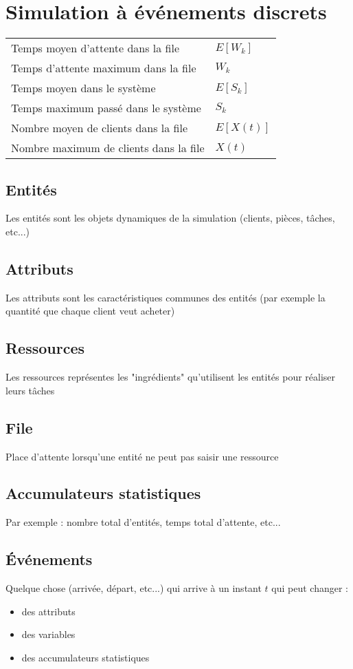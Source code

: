 \documentclass[resume]{subfiles}
\begin{document}
\section{Simulation à événements discrets}
\begin{center}
\small
\begin{tabular}{ll}
Temps moyen d'attente dans la file & $E[W_k]$\\
Temps d'attente maximum dans la file & $W_k$\\
Temps moyen dans le système & $E[S_k]$\\
Temps maximum passé dans le système & $S_k$\\
Nombre moyen de clients dans la file & $E[X(t)]$\\
Nombre maximum de clients dans la file & $X(t)$\\
\end{tabular}
\end{center}
\subsection{Entités}
Les entités sont les objets dynamiques de la simulation (clients, pièces, tâches, etc...)
\subsection{Attributs}
Les attributs sont les caractéristiques communes des entités (par exemple la quantité que chaque client veut acheter)
\subsection{Ressources}
Les ressources représentes les "ingrédients" qu'utilisent les entités pour réaliser leurs tâches
\subsection{File}
Place d'attente lorsqu'une entité ne peut pas saisir une ressource
\subsection{Accumulateurs statistiques}
Par exemple : nombre total d'entités, temps total d'attente, etc...
\subsection{Événements}
Quelque chose (arrivée, départ, etc...) qui arrive à un instant $t$ qui peut changer :
\begin{itemize}
\item des attributs
\item des variables
\item des accumulateurs statistiques
\end{itemize}
\end{document}
